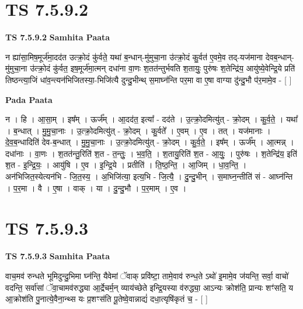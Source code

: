 \documentclass[17pt]{extarticle}
\begin{document}
\section*{ TS 7.5.9.2 }

\textbf{TS 7.5.9.2 } \newline
\textbf{Samhita Paata} \newline

न ह्या॑सा॒मिष॒मूर्ज॑मा॒दद॑त उत्क्रो॒दं कु॑र्वते॒ यथा॑ ब॒न्धान्-मु॑मुचा॒ना उ॑त्क्रो॒दं कु॒र्वत॑ ए॒वमे॒व तद्-यज॑माना देवब॒न्धान्-मु॑मुचा॒ना उ॑त्क्रो॒दं कु॑र्वत॒ इष॒मूर्ज॑मा॒त्मन् दधा॑ना वा॒णः श॒तत॑न्तुर्भवति श॒तायुः॒ पुरु॑षः श॒तेन्द्रि॑य॒ आयु॑ष्ये॒वेन्द्रि॒ये प्रति॑ तिष्ठन्त्या॒जिं धा॑व॒न्त्यन॑भिजितस्या॒-भिजि॑त्यै दुन्दु॒भीन्थ् स॒माघ्न॑न्ति पर॒मा वा ए॒षा वाग्या दु॑न्दु॒भौ प॑र॒मामे॒व - [  ] \newline

\textbf{Pada Paata} \newline

न । हि । आ॒सा॒म् । इष᳚म् । ऊर्ज᳚म् । आ॒दद॑त॒ इत्या᳚ - दद॑ते । उ॒त्क्रो॒दमित्यु॑त् - क्रो॒दम् । कु॒र्व॒ते॒ । यथा᳚ । ब॒न्धात् । मु॒मु॒चा॒नाः । उ॒त्क्रो॒दमित्यु॑त् - क्रो॒दम् । कु॒र्वते᳚ । ए॒वम् । ए॒व । तत् । यज॑मानाः । दे॒व॒ब॒न्धादिति॑ देव-ब॒न्धात् । मु॒मु॒चा॒नाः । उ॒त्क्रो॒दमित्यु॑त् - क्रो॒दम् । कु॒र्व॒ते॒ । इष᳚म् । ऊर्ज᳚म् । आ॒त्मन्न् । दधा॑नाः । वा॒णः । श॒तत॑न्तु॒रिति॑ श॒त - त॒न्तुः॒ । भ॒व॒ति॒ । श॒तायु॒रिति॑ श॒त - आ॒युः॒ । पुरु॑षः । श॒तेन्द्रि॑य॒ इति॑ श॒त - इ॒न्द्रि॒यः॒ । आयु॑षि । ए॒व । इ॒न्द्रि॒ये । प्रतीति॑ । ति॒ष्ठ॒न्ति॒ । आ॒जिम् । धा॒व॒न्ति॒ । अन॑भिजित॒स्येत्यन॑भि - जि॒त॒स्य॒ । अ॒भिजि॑त्या॒ इत्य॒भि - जि॒त्यै॒ । दु॒न्दु॒भीन् । स॒माघ्न॒न्तीति॑ सं - आघ्न॑न्ति । प॒र॒मा । वै । ए॒षा । वाक् । या । दु॒न्दु॒भौ । प॒र॒माम् । ए॒व ।  \newline




\section*{ TS 7.5.9.3 }

\textbf{TS 7.5.9.3 } \newline
\textbf{Samhita Paata} \newline

वाच॒मव॑ रुन्धते भूमिदुन्दु॒भिमा घ्न॑न्ति॒ यैवेमां ॅवाक् प्रवि॑ष्टा॒ तामे॒वाव॑ रुन्ध॒ते ऽथो॑ इ॒मामे॒व ज॑यन्ति॒ सर्वा॒ वाचो॑ वदन्ति॒ सर्वा॑सां ॅवा॒चामव॑रुद्ध्या आ॒र्द्रेचर्म॒न् व्याय॑च्छेते इन्द्रि॒यस्या व॑रुद्ध्या॒ आऽन्यः क्रोश॑ति॒ प्रान्यः शꣳ॑सति॒ य आ॒क्रोश॑ति पु॒नात्ये॒वैना॒न्थ्स यः प्र॒शꣳस॑ति पू॒तेष्वे॒वान्नाद्यं॑ दधा॒त्यृषि॑कृतं च॒ - [  ] \newline
\end{document}
